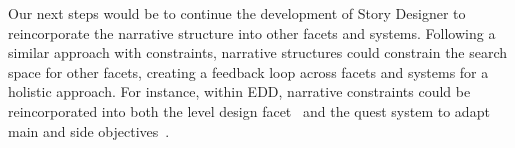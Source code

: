 


Our next steps would be to continue the development of Story Designer to reincorporate the narrative structure into other facets and systems. Following a similar approach with constraints, narrative structures could constrain the search space for other facets, creating a feedback loop across facets and systems for a holistic approach. For instance, within EDD, narrative constraints could be reincorporated into both the level design facet~\cite{p11alvarez_empowering_2019} and the quest system to adapt main and side objectives~\cite{p11alvarez_questgram_2021}.





